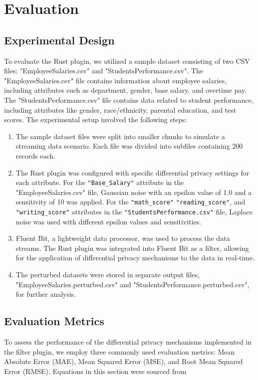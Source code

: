 \chapter{Evaluation\label{chap:evaluation}}
\section{Experimental Design}
To evaluate the Rust plugin, we utilized a sample dataset consisting of two CSV files: "EmployeeSalaries.csv" and "StudentsPerformance.csv". The "EmployeeSalaries.csv" file contains information about employee salaries, including attributes such as department, gender, base salary, and overtime pay. The "StudentsPerformance.csv" file contains data related to student performance, including attributes like gender, race/ethnicity, parental education, and test scores.
The experimental setup involved the following steps:

\begin{enumerate}
    \item The sample dataset files were split into smaller chunks to simulate a streaming data scenario. Each file was divided into subfiles containing 200 records each.
    \item The Rust plugin was configured with specific differential privacy settings for each attribute. For the \texttt{"Base\_Salary"} attribute in the "EmployeeSalaries.csv" file, Gaussian noise with an epsilon value of 1.0 and a sensitivity of 10 was applied. For the \texttt{"math\_score"} \texttt{"reading\_score"}, and \texttt{"writing\_score"} attributes in the \texttt{"StudentsPerformance.csv"} file, Laplace noise was used with different epsilon values and sensitivities.
    \item Fluent Bit, a lightweight data processor, was used to process the data streams. The Rust plugin was integrated into Fluent Bit as a filter, allowing for the application of differential privacy mechanisms to the data in real-time.
    \item The perturbed datasets were stored in separate output files, "EmployeeSalaries.perturbed.csv" and "StudentsPerformance.perturbed.csv", for further analysis.
\end{enumerate}
\section{Evaluation Metrics}
To assess the performance of the differential privacy mechanisms implemented in the filter plugin, we employ three commonly used evaluation metrics: Mean Absolute Error (MAE), Mean Squared Error (MSE), and Root Mean Squared Error (RMSE). Equations in this section were sourced from \cite{Hodson2022}
